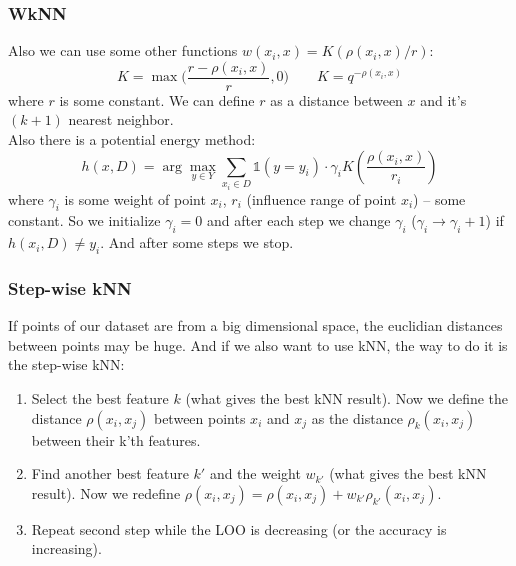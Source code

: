 \subsubsection*{WkNN}

Also we can use some other functions $w(x_i,x)=K(\rho(x_i,x)/r)$:
$$K=\max\Big(\frac{r-\rho(x_i,x)}{r}, 0\Big)\qquad K=q^{-\rho(x_i,x)}$$
where $r$ is some constant. We can define $r$ as a distance between $x$ and it's $(k+1)$ nearest neighbor.\\
Also there is a potential energy method:
$$h(x, D)=\arg\max\limits_{y\in Y}\sum\limits_{x_i\in D}\mathbb{1}(y=y_i)\cdot\gamma_i K\left(\frac{\rho(x_i,x)}{r_i}\right)$$
where $\gamma_i$ is some weight of point $x_i$, $r_i$ (influence range of point $x_i$) -- some constant. So we initialize $\gamma_i=0$ and after each step we change $\gamma_i$ ($\gamma_i\to\gamma_i+1$) if $h(x_i, D)\ne y_i$. And after some steps we stop.

\subsubsection*{Step-wise kNN}

If points of our dataset are from a big dimensional space, the euclidian distances between points may be huge. And if we also want to use kNN, the way to do it is the step-wise kNN:
\begin{enumerate}
	\item Select the best feature $k$ (what gives the best kNN result). Now we define the distance $\rho(x_i, x_j)$ between points $x_i$ and $x_j$ as the distance $\rho_k(x_i,x_j)$ between their k'th features.
	\item Find another best feature $k'$ and the weight $w_{k'}$ (what gives the best kNN result). Now we redefine $\rho(x_i,x_j)=\rho(x_i,x_j)+w_{k'}\rho_{k'}(x_i,x_j)$.
	\item Repeat second step while the LOO is decreasing (or the accuracy is increasing).
\end{enumerate}